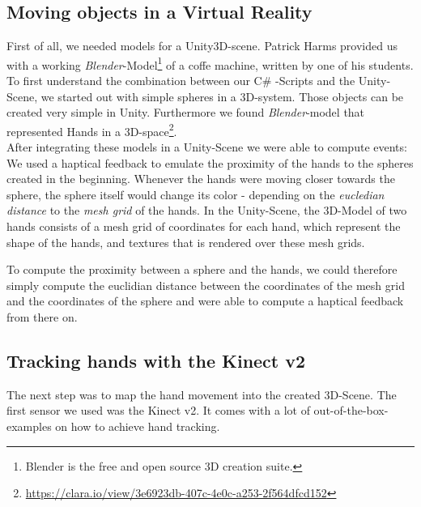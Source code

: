 \documentclass[11pt,a4paper,oldfontcommands, oneside]{memoir}
\begin{document}
\subsection{Moving objects in a Virtual Reality}
First of all, we needed models for a Unity3D-scene. Patrick Harms provided us with a working \emph{Blender}-Model\footnote{Blender is the free and open source 3D creation suite.} of a coffe machine, written by one of his students.
\\
To first understand the combination between our C\# -Scripts and the Unity-Scene, we started out with simple spheres in a 3D-system. Those objects can be created very simple in Unity. Furthermore we found \emph{Blender}-model that represented Hands in a 3D-space\footnote{\url{https://clara.io/view/3e6923db-407c-4e0c-a253-2f564dfcd152}}. \\
After integrating these models in a Unity-Scene we were able to compute events: \\
We used a haptical feedback to emulate the proximity of the hands to the spheres created in the beginning. Whenever the hands were moving closer towards the sphere, the sphere itself would change its color - depending on the \emph{eucledian distance} to the \emph{mesh grid} of the hands. In the Unity-Scene, the 3D-Model of two hands consists of a mesh grid of coordinates for each hand, which represent the shape of the hands, and textures that is rendered over these mesh grids. 


To compute the proximity between a sphere and the hands, we could therefore simply compute the euclidian distance between the coordinates of the mesh grid and the coordinates of the sphere and were able to compute a haptical feedback from there on.

\subsection{Tracking hands with the Kinect v2}
The next step was to map the hand movement into the created 3D-Scene. The first sensor we used was the Kinect v2. It comes with a lot of out-of-the-box-examples on how to achieve hand tracking. 
\end{document}
